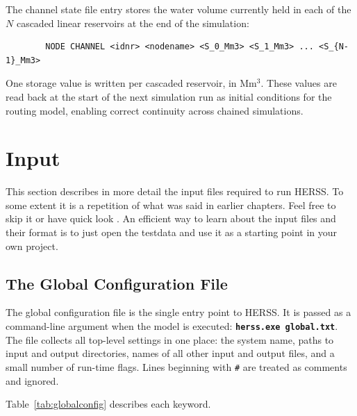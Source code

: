 \documentclass[a4paper, 12pt]{report}
\newcommand{\cmd}[1]{\textbf{\texttt{#1}}}
\begin{document}
	The channel state file entry stores the water volume currently held in each of the $N$
	cascaded linear reservoirs at the end of the simulation:

	\begin{verbatim}
		NODE CHANNEL <idnr> <nodename> <S_0_Mm3> <S_1_Mm3> ... <S_{N-1}_Mm3>
	\end{verbatim}

	One storage value is written per cascaded reservoir, in Mm$^3$. These values are read back
	at the start of the next simulation run as initial conditions for the routing model, enabling correct continuity across chained simulations.

	\section{Input}
	This section describes in more detail the input files required to run HERSS. To some extent it is a repetition of what was said in earlier chapters. Feel free to skip it or have quick look \smiley{}. An efficient way to learn about the input files and their format is to just open the testdata and use it as a starting point in your own project. 
	
	\subsection{The Global Configuration File}
	\label{sec:globalconfig}

	The global configuration file is the single entry point to HERSS. It is passed as a
	command-line argument when the model is executed: \cmd{herss.exe global.txt}. 
	The file collects all top-level settings in one place: the system name, 
	paths to input and output directories, names of all other input and 
	output files, and a small number of run-time flags. 
	Lines beginning with \texttt{\#} are treated as comments and ignored.

	Table~\ref{tab:globalconfig} describes each keyword.
\end{document}
